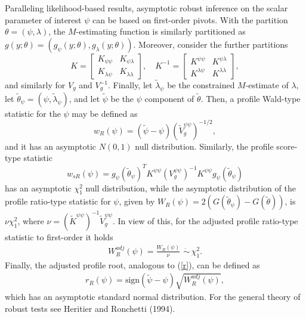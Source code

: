 \documentclass[preprint,12pt,authoryear]{elsarticle}
\begin{document}
Paralleling likelihood-based results, asymptotic robust inference on the scalar parameter of interest $\psi$ can be based on first-order pivots.  With the
partition $\theta=(\psi,\lambda)$, the $M$-estimating function is similarly
partitioned as $g(y;\theta)=(g_\psi(y;\theta),g_\lambda(y;\theta))$. Moreover,
consider the further partitions
$$
K = \left[
  \begin{array}{cc}
    K_{\psi \psi} & K_{\psi \lambda} \\
    K_{\lambda \psi} & K_{\lambda \lambda}
  \end{array}
\right], \quad K^{-1} = \left[
  \begin{array}{cc}
    K^{\psi \psi} & K^{\psi \lambda} \\
    K^{\lambda \psi} & K^{\lambda \lambda}
  \end{array}
\right],
$$
and similarly for $V_g$ and $V_g^{-1}$. Finally, let $\tilde\lambda_\psi$ be the constrained $M$-estimate of $\lambda$, let $\tilde\theta_\psi=(\psi,\tilde\lambda_\psi)$, and let $\tilde\psi$ be the $\psi$ component of $\tilde\theta$. Then, a profile Wald-type statistic for the $\psi$ may be defined as
$$
 w_{R}  (\psi) = (\tilde\psi - \psi) (\tilde{V}_g^{\psi \psi})^{-1/2},
$$
and it has an asymptotic $N(0,1)$ null distribution. Similarly, the profile score-type statistic
$$
w_{sR}  (\psi) = g_\psi (\tilde\theta_{\psi})^T K^{\psi \psi}
(V_g^{\psi \psi})^{-1} K^{\psi \psi} g_\psi (\tilde\theta_{\psi})
$$ 
has an asymptotic $\chi^2_1$ null distribution, while the asymptotic distribution of the profile  ratio-type statistic for $\psi$, given by $W_{R} (\psi) = 2 \left( G(\tilde\theta_{\psi}) - G(\tilde\theta) \right)$,
is $ \nu \chi^2_1$, where $\nu = (\tilde{K}^{\psi \psi})^{-1} \tilde{V}_g^{\psi \psi}$.  In view of this, for the adjusted profile ratio-type statistic to first-order it holds
  \begin{eqnarray*}
   W_{R}^{adj} (\psi) = \frac{W_{R} (\psi)}{\nu}\ \, \dot{\sim} \,  \chi^2_1.
    \label{swadj}
  \end{eqnarray*}
Finally, the adjusted profile root, analogous to (\ref{r}), can be defined as
\begin{eqnarray*}
r_{R} (\psi) = \text{sign} (\tilde\psi - \psi) \sqrt{ W_{R}^{adj} (\psi) },
\label{rsradj}
\end{eqnarray*} 
which has an asymptotic standard normal distribution. For the general theory of robust tests see Heritier and Ronchetti (1994). 
\end{document}
